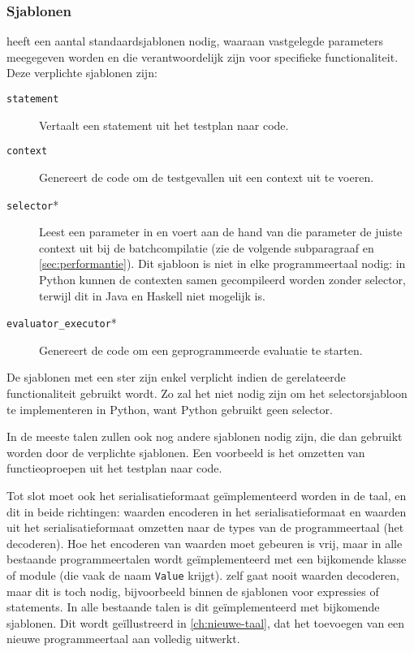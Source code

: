 \subsubsection{Sjablonen}

\tested{} heeft een aantal standaardsjablonen nodig, waaraan vastgelegde parameters meegegeven worden en die verantwoordelijk zijn voor specifieke functionaliteit.
Deze verplichte sjablonen zijn:

\begin{description}
    \item[\texttt{statement}] Vertaalt een statement uit het testplan naar code.
    \item[\texttt{context}] Genereert de code om de testgevallen uit een context uit te voeren.
    \item[\texttt{selector}*] Leest een parameter in en voert aan de hand van die parameter de juiste context uit bij de batchcompilatie (zie de volgende subparagraaf en \cref{sec:performantie}).
    Dit sjabloon is niet in elke programmeertaal nodig: in Python kunnen de contexten samen gecompileerd worden zonder selector, terwijl dit in Java en Haskell niet mogelijk is.
    \item[\texttt{evaluator\_executor}*] Genereert de code om een geprogrammeerde evaluatie te starten.
\end{description}

De sjablonen met een ster zijn enkel verplicht indien de gerelateerde functionaliteit gebruikt wordt.
Zo zal het niet nodig zijn om het selectorsjabloon te implementeren in Python, want Python gebruikt geen selector.

In de meeste talen zullen ook nog andere sjablonen nodig zijn, die dan gebruikt worden door de verplichte sjablonen.
Een voorbeeld is het omzetten van functieoproepen uit het testplan naar code.

Tot slot moet ook het serialisatieformaat geïmplementeerd worden in de taal, en dit in beide richtingen: waarden encoderen in het serialisatieformaat en waarden uit het serialisatieformaat omzetten naar de types van de programmeertaal (het decoderen).
Hoe het encoderen van waarden moet gebeuren is vrij, maar in alle bestaande programmeertalen wordt geïmplementeerd met een bijkomende klasse of module (die vaak de naam \texttt{Value} krijgt).
\tested{} zelf gaat nooit waarden decoderen, maar dit is toch nodig, bijvoorbeeld binnen de sjablonen voor expressies of statements.
In alle bestaande talen is dit geïmplementeerd met bijkomende sjablonen.
Dit wordt geïllustreerd in \cref{ch:nieuwe-taal}, dat het toevoegen van een nieuwe programmeertaal aan \tested{} volledig uitwerkt.

